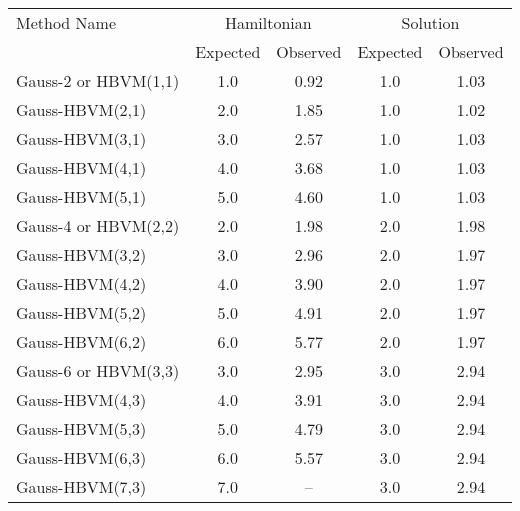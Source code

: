 \begin{tabular}{l|cccc}
\toprule
         Method Name & \multicolumn{2}{c}{Hamiltonian} & \multicolumn{2}{c}{Solution} \\
                     &    Expected & Observed & Expected & Observed \\
\midrule
Gauss-2 or HBVM(1,1) &         1.0 &     0.92 &      1.0 &     1.03 \\
     Gauss-HBVM(2,1) &         2.0 &     1.85 &      1.0 &     1.02 \\
     Gauss-HBVM(3,1) &         3.0 &     2.57 &      1.0 &     1.03 \\
     Gauss-HBVM(4,1) &         4.0 &     3.68 &      1.0 &     1.03 \\
     Gauss-HBVM(5,1) &         5.0 &     4.60 &      1.0 &     1.03 \\
Gauss-4 or HBVM(2,2) &         2.0 &     1.98 &      2.0 &     1.98 \\
     Gauss-HBVM(3,2) &         3.0 &     2.96 &      2.0 &     1.97 \\
     Gauss-HBVM(4,2) &         4.0 &     3.90 &      2.0 &     1.97 \\
     Gauss-HBVM(5,2) &         5.0 &     4.91 &      2.0 &     1.97 \\
     Gauss-HBVM(6,2) &         6.0 &     5.77 &      2.0 &     1.97 \\
Gauss-6 or HBVM(3,3) &         3.0 &     2.95 &      3.0 &     2.94 \\
     Gauss-HBVM(4,3) &         4.0 &     3.91 &      3.0 &     2.94 \\
     Gauss-HBVM(5,3) &         5.0 &     4.79 &      3.0 &     2.94 \\
     Gauss-HBVM(6,3) &         6.0 &     5.57 &      3.0 &     2.94 \\
     Gauss-HBVM(7,3) &         7.0 &       -- &      3.0 &     2.94 \\
\bottomrule
\end{tabular}
